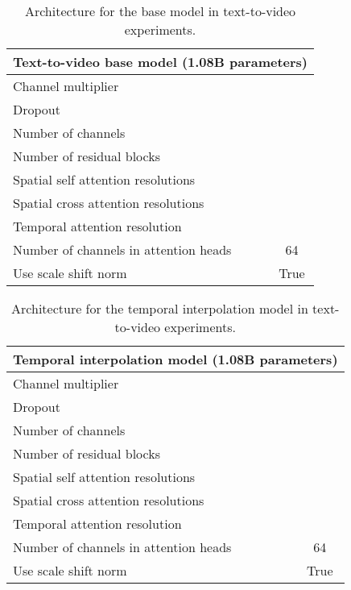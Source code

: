 \documentclass[10pt,twocolumn,letterpaper]{article}
\begin{document}
\vfill\null

\begin{table}[!ht]
    \centering
    \caption{Architecture for the base model in text-to-video experiments.}
    \vspace{-1mm}
    \label{tab:text2video_arch_base}
    \begin{tabular}{l c}
        \toprule
        \multicolumn{2}{c}{Text-to-video base model (1.08B parameters)}\\
        \midrule
        Channel multiplier &  \\
        Dropout &  \\
        Number of channels &  \\
        Number of residual blocks &  \\
        Spatial self attention resolutions &  \\
        Spatial cross attention resolutions &  \\
        Temporal attention resolution &  \\
        Number of channels in attention heads & 64\\
        Use scale shift norm & True \\
        \bottomrule
    \end{tabular}
\end{table}

\begin{table}[!ht]
    \centering
    \caption{Architecture for the temporal interpolation model in text-to-video experiments.}
    \vspace{-1mm}
    \label{tab:text2video_arch_ti}
    \begin{tabular}{l c}
        \toprule
        \multicolumn{2}{c}{Temporal interpolation model (1.08B parameters)}\\
        \midrule
        Channel multiplier &  \\
        Dropout &  \\
        Number of channels &  \\
        Number of residual blocks &  \\
        Spatial self attention resolutions &  \\
        Spatial cross attention resolutions &  \\
        Temporal attention resolution &  \\
        Number of channels in attention heads & 64\\
        Use scale shift norm & True \\
        \bottomrule
    \end{tabular}
\end{table}
\end{document}
